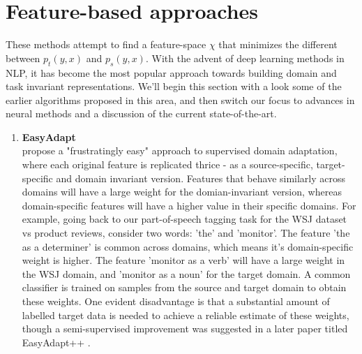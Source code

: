 \documentclass[12pt]{report}
\begin{document}
	
	\section{Feature-based approaches} \label{feature_based}
	These methods attempt to find a feature-space $\chi$ that minimizes the different between $p_{t}(y,x)$ and $p_{s}(y,x)$. With the advent of deep learning methods in NLP, it has become the most popular approach towards building domain and task invariant representations. We'll begin this section with a look some of the earlier algorithms proposed in this area, and then switch our focus to advances in neural methods and a discussion of the current state-of-the-art.
	\begin{enumerate}
		\item \textbf{EasyAdapt} \\
		\citep{daume2007frustratingly} propose a "frustratingly easy" approach to supervised domain adaptation, where each original feature is replicated thrice - as a source-specific, target-specific and domain invariant version. Features that behave similarly across domains will have a large weight for the domian-invariant version, whereas domain-specific features will have a higher value in their specific domains. For example, going back to our part-of-speech tagging task for the WSJ dataset vs product reviews, consider two words: 'the' and 'monitor'. The feature 'the as a determiner' is common across domains, which means it's domain-specific weight is higher. The feature 'monitor as a verb' will have a large weight in the WSJ domain, and 'monitor as a noun' for the target domain. A common classifier is trained on samples from the source and target domain to obtain these weights. One evident disadvantage is that a substantial amount of labelled target data is needed to achieve a reliable estimate of these weights, though a semi-supervised improvement was suggested in a later paper titled EasyAdapt++ \citep{daume2010frustratingly}. 
		

\end{enumerate}
\end{document}
